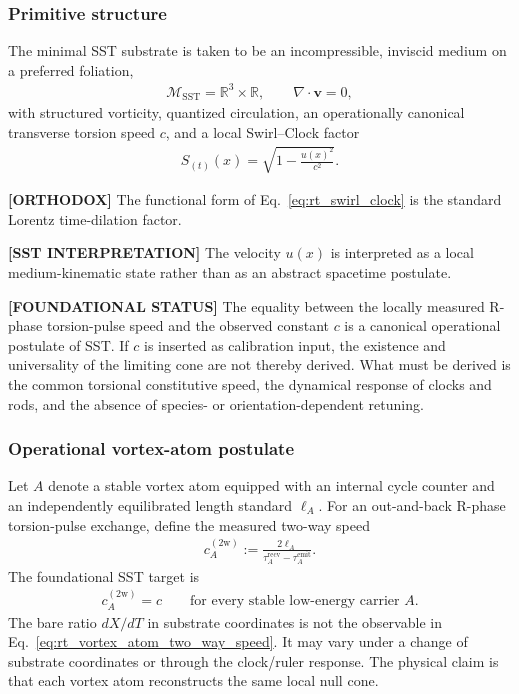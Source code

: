 \subsubsection{Primitive structure}

The minimal SST substrate is taken to be an incompressible, inviscid medium on a
preferred foliation,
\begin{align}
    \mathcal{M}_{\mathrm{SST}}
    =
    \mathbb{R}^3 \times \mathbb{R},
    \qquad
    \nabla\cdot \mathbf{v}=0 ,
\end{align}
with structured vorticity, quantized circulation, an operationally canonical
transverse torsion speed \(c\), and a local Swirl--Clock factor
\begin{align}
    S_{(t)}(x)
    =
    \sqrt{1-\frac{u(x)^2}{c^2}} .
    \label{eq:rt_swirl_clock}
\end{align}

\textbf{[ORTHODOX]} The functional form of
Eq.~\eqref{eq:rt_swirl_clock} is the standard Lorentz time-dilation factor.

\textbf{[SST INTERPRETATION]} The velocity \(u(x)\) is interpreted as a local
medium-kinematic state rather than as an abstract spacetime postulate.

\textbf{[FOUNDATIONAL STATUS]} The equality between the locally measured
R-phase torsion-pulse speed and the observed constant \(c\) is a canonical
operational postulate of SST. If \(c\) is inserted as calibration input, the
existence and universality of the limiting cone are not thereby derived. What
must be derived is the common torsional constitutive speed, the dynamical
response of clocks and rods, and the absence of species- or orientation-dependent
retuning.

\subsubsection{Operational vortex-atom postulate}

Let \(A\) denote a stable vortex atom equipped with an internal cycle counter and
an independently equilibrated length standard \(\ell_A\). For an out-and-back
R-phase torsion-pulse exchange, define the measured two-way speed
\begin{align}
    c_A^{(2\mathrm w)}
    :=
    \frac{2\ell_A}
    {\tau_A^{\mathrm{recv}}-\tau_A^{\mathrm{emit}}} .
    \label{eq:rt_vortex_atom_two_way_speed}
\end{align}
The foundational SST target is
\begin{align}
    \boxed{
    c_A^{(2\mathrm w)}=c
    }
    \qquad
    \text{for every stable low-energy carrier }A .
    \label{eq:rt_vortex_atom_luminal_postulate}
\end{align}
The bare ratio \(dX/dT\) in substrate coordinates is not the observable in
Eq.~\eqref{eq:rt_vortex_atom_two_way_speed}. It may vary under a change of
substrate coordinates or through the clock/ruler response. The physical claim is
that each vortex atom reconstructs the same local null cone.

